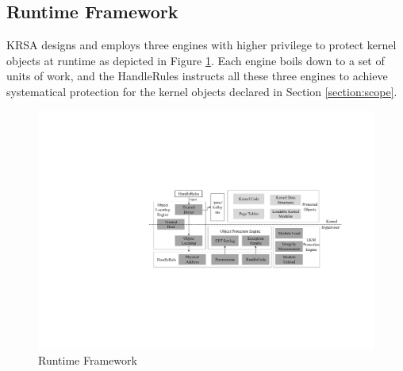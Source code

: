 \documentclass[conference]{IEEEtran}
\begin{document}

\subsection{Runtime Framework} \label{section:frame}

KRSA designs and employs three engines with higher privilege to protect kernel objects at runtime as depicted in Figure \ref{arch}. Each engine boils down to a set of units of work, and the HandleRules instructs all these three engines to achieve systematical protection for the kernel objects declared in Section \ref{section:scope}. 

\begin{figure}
    \centering
    \includegraphics[scale=0.5]{pic/architecture.pdf}
    \caption{Runtime Framework}
    \label{arch}
\end{figure}

\end{document}
